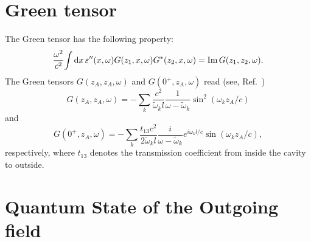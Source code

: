 \documentclass[pra, twocolumn]{revtex4}
\newcommand{\D}{\mbox{\rm d}}
\begin{document}
\appendix

\section{Green tensor }
\label{app}
   The Green tensor has the following property:
   \begin{equation}
     \label{app:1}
     \frac {\omega ^2} {c^2}\!
     \int  \D x\,
      \varepsilon''(x, \omega)
     G(z_1, x, \omega)G^*(z_2, x, \omega)
    =
     \mathrm{Im}\,G
     (z_1, z_2,\omega) .
   \end{equation}
The Green tensors $G (z_A, z_A, \omega )$
and $G (0^+, z_A, \omega )$
read (see, Ref.~\cite{khanbekyan:013822})
\begin{equation}
  \label{app:2}
   G (z_A, z_A, \omega )
    = -
   \sum _k
   \frac{c^2}{ \tilde{\omega}_kl}
   \frac{1} {\omega-\tilde{\omega}_k}
   \sin ^2( \omega_k  z_A/c)
\end{equation}
and
\begin{equation}
  \label{app:3}
   G (0^+, z_A, \omega )
    = -
   \sum _k
   \frac{t_{13}c^2}{2 \tilde{\omega}_k l}
   \frac{i} {\omega-\tilde{\omega}_k}
   e^{i\omega_k l/c}
   \sin ( \omega_k  z_A/c),
\end{equation}
respectively,
where $t_{13}$ denotes the transmission coefficient from inside the
cavity to outside.


\section{Quantum State of the Outgoing field}
\label{app2}
\end{document}
